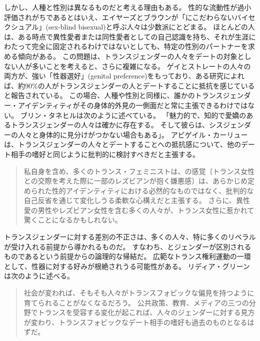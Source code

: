 \documentclass[paper=a4,book,openany]{jlreq}
\newcommand{\ig}[1]{}           %
\begin{document}
しかし、人種と性別は異なるものだと考える理由もある。
性的な流動性が過小評価されがちであるとはいえ、エイヤーズとブラウンが「にこだわらないバイセクシュアル」(sex-blind bisexual)と呼ぶ人々は少数派にとどまる。
ほとんどの人は、ある時点で異性愛者または同性愛者としての自己認識を持ち、それが生涯にわたって完全に固定されるわけではないとしても、特定の性別のパートナーを求める傾向がある。
この問題は、トランスジェンダーの人々をデートの対象としない人が多いことを考えると、さらに複雑になる。
ゲイとストレートの人々の両方が、強い「性器選好」(genital preference)をもっており、ある研究によれば、約90\%の人がトランスジェンダーの人とデートすることに抵抗を感じていると報告されている\citep{blair19:_trans_exclus_world_datin}。
この場合、人種や性別と同様に、誰かのトランスジェンダー・アイデンティティがその身体的外見の一側面だと常に主張できるわけではない。
ブリン・タネヒルは次のように述べている。
「魅力的で、知的で愛嬌のあるトランスジェンダーの人々は確かに存在する。
そして彼らは、シスジェンダーの人々と身体的に見分けがつかない場合もある」\citep{tannehill19:_is_refus_date}。
アビゲイル・カーリューは、トランスジェンダーの人々とデートすることへの抵抗感について、他のデート相手の嗜好と同じように批判的に検討すべきだと主張する。

\begin{quote}
私自身を含め、多くのトランス・フェミニストは、の感覚〔トランス女性との交際を考えた際に一部のレズビアンが抱く嫌悪感〕は、あらかじめ定められた性的アイデンティティにおける必然的なものではなく、批判的な自己反省を通じて変化しうる柔軟な心構えだと主張する。
さらに、異性愛の男性やレズビアン女性を含む多くの人々が、トランス女性に惹かれて驚くことになるかもしれない。
\citep{curlew18:_whats_wrong_no}
\end{quote}

トランスジェンダーに対する差別の不正さは、多くの人々、特に多くのリベラルが受け入れる前提から導かれるものだ。
すなわち、とジェンダーが区別されるものであるという前提からの論理的な帰結だ。
広範なトランス権利運動の一環として、性器に対する好みが根絶されうる可能性がある。
リディア・グリーン\ig{Lydia Green}は次のように述べる。

\begin{quote}
  社会が変われば、そもそも人々がトランスフォビックな偏見を持つように育てられることがなくなるだろう。
公共政策、教育、メディアの三つの分野でトランスを受容する変化が起これば、人々のジェンダーに対する見方が変わり、トランスフォビックなデート相手の嗜好も過去のものとなるはずだ。
\citep{green17:_to_be_effec}
\end{quote}
\end{document}
